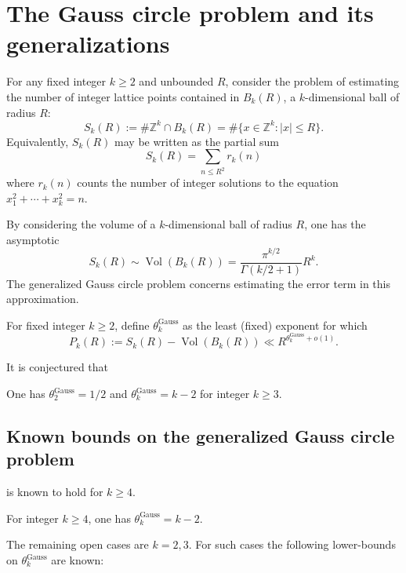 \chapter{The Gauss circle problem and its generalizations}\label{gauss-circle-chapter}

\unintegrated

For any fixed integer $k \ge 2$ and unbounded $R$, consider the problem of estimating the number of integer lattice points contained in $B_k(R)$, a $k$-dimensional ball of radius $R$:
\[
S_k(R) := \# \mathbb{Z}^k \cap B_k(R) = \# \{x \in \mathbb{Z}^k: |x| \le R\}.
\]
Equivalently, $S_k(R)$ may be written as the partial sum 
\[
S_k(R) = \sum_{n \le R^{2}}r_k(n)
\]
where $r_k(n)$ counts the number of integer solutions to the equation $x_1^2 + \cdots + x_k^2 = n$.

By considering the volume of a $k$-dimensional ball of radius $R$, one has the asymptotic
\[
S_k(R) \sim \operatorname{Vol}(B_k(R)) = \frac{\pi^{k/2}}{\Gamma(k/2 + 1)}R^k.
\]
The generalized Gauss circle problem concerns estimating the error term in this approximation.

\begin{definition}
For fixed integer $k \ge 2$, define $\theta^{\operatorname{Gauss}}_{k}$ as the least (fixed) exponent for which
\[
P_k(R) := S_k(R) - \operatorname{Vol}(B_k(R)) \ll R^{\theta^{\operatorname{Gauss}}_{k} + o(1)}.
\]
\end{definition}

It is conjectured that 

\begin{conjecture}\label{gauss-circle-conj}
One has $\theta^{\operatorname{Gauss}}_{2} = 1/2$ and $\theta^{\operatorname{Gauss}}_{k} = k - 2$ for integer $k \ge 3$.
\end{conjecture}


\section{Known bounds on the generalized Gauss circle problem}

 is known to hold for $k \ge 4$. 

\begin{theorem}
For integer $k \ge 4$, one has $\theta^{\operatorname{Gauss}}_{k} = k - 2$.
\end{theorem}

The remaining open cases are $k = 2, 3$. For such cases the following lower-bounds on $\theta^{\operatorname{Gauss}}_{k}$ are known:


